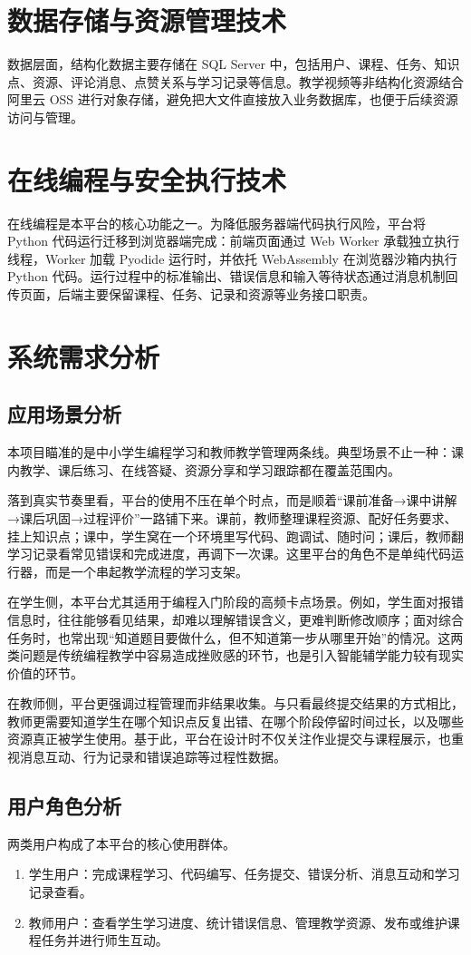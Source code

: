 \section{数据存储与资源管理技术}
数据层面，结构化数据主要存储在 SQL Server 中，包括用户、课程、任务、知识点、资源、评论消息、点赞关系与学习记录等信息。教学视频等非结构化资源结合阿里云 OSS 进行对象存储，避免把大文件直接放入业务数据库，也便于后续资源访问与管理。

\section{在线编程与安全执行技术}
在线编程是本平台的核心功能之一。为降低服务器端代码执行风险，平台将 Python 代码运行迁移到浏览器端完成：前端页面通过 Web Worker 承载独立执行线程，Worker 加载 Pyodide 运行时，并依托 WebAssembly 在浏览器沙箱内执行 Python 代码。运行过程中的标准输出、错误信息和输入等待状态通过消息机制回传页面，后端主要保留课程、任务、记录和资源等业务接口职责。

\section{系统需求分析}
\subsection{应用场景分析}
本项目瞄准的是中小学生编程学习和教师教学管理两条线。典型场景不止一种：课内教学、课后练习、在线答疑、资源分享和学习跟踪都在覆盖范围内。

落到真实节奏里看，平台的使用不压在单个时点，而是顺着“课前准备→课中讲解→课后巩固→过程评价”一路铺下来。课前，教师整理课程资源、配好任务要求、挂上知识点；课中，学生窝在一个环境里写代码、跑调试、随时问；课后，教师翻学习记录看常见错误和完成进度，再调下一次课。这里平台的角色不是单纯代码运行器，而是一个串起教学流程的学习支架。

在学生侧，本平台尤其适用于编程入门阶段的高频卡点场景。例如，学生面对报错信息时，往往能够看见结果，却难以理解错误含义，更难判断修改顺序；面对综合任务时，也常出现“知道题目要做什么，但不知道第一步从哪里开始”的情况。这两类问题是传统编程教学中容易造成挫败感的环节，也是引入智能辅学能力较有现实价值的环节。

在教师侧，平台更强调过程管理而非结果收集。与只看最终提交结果的方式相比，教师更需要知道学生在哪个知识点反复出错、在哪个阶段停留时间过长，以及哪些资源真正被学生使用。基于此，平台在设计时不仅关注作业提交与课程展示，也重视消息互动、行为记录和错误追踪等过程性数据。

\subsection{用户角色分析}
两类用户构成了本平台的核心使用群体。
\begin{enumerate}
  \item 学生用户：完成课程学习、代码编写、任务提交、错误分析、消息互动和学习记录查看。
  \item 教师用户：查看学生学习进度、统计错误信息、管理教学资源、发布或维护课程任务并进行师生互动。
\end{enumerate}


